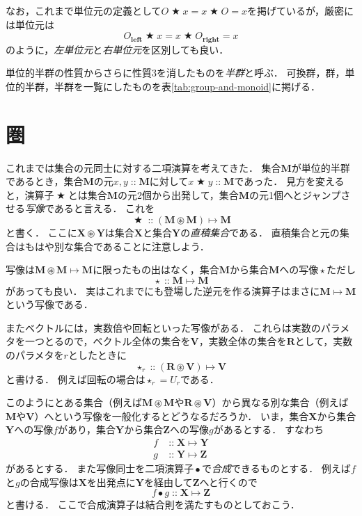 \documentclass[twocolumn]{jsbook}
\newcommand{\mathKeyword}[1]{\mathbf{#1}}
\DeclareMathOperator{\mathAnyBinaryOperator}{\bigstar}
\DeclareMathOperator{\mathAnyUnaryOperator}{\star}
\DeclareMathOperator{\mathCompose}{\bullet}
\DeclareMathOperator{\mathIn}{::}
\DeclareMathOperator{\mathMapsTo}{\mapsto}
\DeclareMathOperator{\mathSetTimes}{\circledast}
\newcommand{\mathLeft}{\mathKeyword{left}}
\newcommand{\mathRight}{\mathKeyword{right}}
\newcommand{\mathSet}[1]{\mathbf{#1}}
\newcommand{\mathMorph}[2]{#1\mathMapsTo#2}
\newcommand{\keyword}[1]{\emph{#1}}
\begin{document}
なお，これまで単位元の定義として$O\mathAnyBinaryOperator x=x\mathAnyBinaryOperator O=x$を掲げているが，厳密には単位元は$$O_\mathLeft\mathAnyBinaryOperator x=x\mathAnyBinaryOperator O_\mathRight=x$$のように，\keyword{左単位元}と\keyword{右単位元}を区別しても良い．

単位的半群の性質からさらに性質3を消したものを\keyword{半群}と呼ぶ．
可換群，群，単位的半群，半群を一覧にしたものを表\ref{tab:group-and-monoid}に掲げる．

\section{圏}

これまでは集合の元同士に対する二項演算を考えてきた．
集合$\mathSet{M}$が単位的半群であるとき，集合$\mathSet{M}$の元$x,y\mathIn\mathSet{M}$に対して$x\mathAnyBinaryOperator y\mathIn\mathSet{M}$であった．
見方を変えると，演算子$\mathAnyBinaryOperator$とは集合$\mathSet{M}$の元2個から出発して，集合$\mathSet{M}$の元1個へとジャンプさせる\keyword{写像}であると言える．
これを$$\mathAnyBinaryOperator\mathIn{}\mathMorph{(\mathSet{M}\mathSetTimes\mathSet{M})}{\mathSet{M}}$$と書く．
ここに$\mathSet{X}\mathSetTimes\mathSet{Y}$は集合$\mathSet{X}$と集合$\mathSet{Y}$の\keyword{直積集合}である．
直積集合と元の集合はもはや別な集合であることに注意しよう．

写像は$\mathMorph{\mathSet{M}\mathSetTimes\mathSet{M}}{\mathSet{M}}$に限ったもの出はなく，集合$\mathSet{M}$から集合$\mathSet{M}$への写像$\mathAnyUnaryOperator$ただし$$\mathAnyUnaryOperator\mathIn\mathMorph{\mathSet{M}}{\mathSet{M}}$$があっても良い．
実はこれまでにも登場した逆元を作る演算子はまさに$\mathMorph{\mathSet{M}}{\mathSet{M}}$という写像である．

またベクトルには，実数倍や回転といった写像がある．
これらは実数のパラメタを一つとるので，ベクトル全体の集合を$\mathSet{V}$，実数全体の集合を$\mathSet{R}$として，実数のパラメタを$r$としたときに$$\mathAnyUnaryOperator_r\mathIn{}\mathMorph{(\mathSet{R}\mathSetTimes\mathSet{V})}{\mathSet{V}}$$と書ける．
例えば回転の場合は$\mathAnyUnaryOperator_r=U_r$である．

このようにとある集合（例えば$\mathSet{M}\mathSetTimes\mathSet{M}$や$\mathSet{R}\mathSetTimes\mathSet{V}$）から異なる別な集合（例えば$\mathSet{M}$や$\mathSet{V}$）へという写像を一般化するとどうなるだろうか．
いま，集合$\mathSet{X}$から集合$\mathSet{Y}$への写像$f$があり，集合$\mathSet{Y}$から集合$\mathSet{Z}$への写像$g$があるとする．
すなわち
\begin{align*}
f&\mathIn\mathMorph{\mathSet{X}}{\mathSet{Y}}\\
g&\mathIn\mathMorph{\mathSet{Y}}{\mathSet{Z}}
\end{align*}
があるとする．
また写像同士を二項演算子$\mathCompose$で\keyword{合成}できるものとする．
例えば$f$と$g$の合成写像は$\mathSet{X}$を出発点に$\mathSet{Y}$を経由して$\mathSet{Z}$へと行くので$$f\mathCompose g\mathIn\mathMorph{\mathSet{X}}{\mathSet{Z}}$$と書ける．
ここで合成演算子は結合則を満たすものとしておこう．
\end{document}
